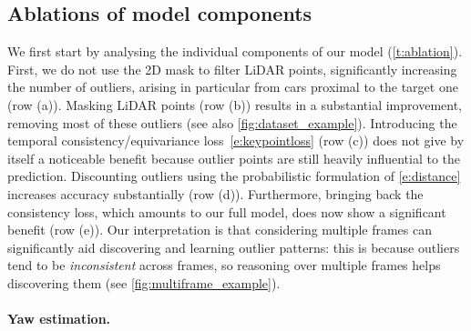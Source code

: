 


\subsection{Ablations of model components}

We first start by analysing the individual components of our model (\cref{t:ablation}).
First, we do not use the 2D mask to filter LiDAR points, significantly increasing the number of outliers, arising in particular from cars proximal to the target one (row (a)).
Masking LiDAR points (row (b)) results in a substantial improvement, removing most of these outliers (see also \cref{fig:dataset_example}).
Introducing the temporal consistency/equivariance loss~\eqref{e:keypointloss} (row (c)) does not give by itself a noticeable benefit because outlier points are still heavily influential to the prediction.
Discounting outliers using the probabilistic formulation of \cref{e:distance} increases accuracy substantially (row (d)).
Furthermore, bringing back the consistency loss, which amounts to our full model, does now show a significant benefit (row (e)).
Our interpretation is that considering multiple frames can significantly aid discovering and learning outlier patterns:
this is because outliers tend to be \emph{inconsistent} across frames, so reasoning over multiple frames helps discovering them (see \cref{fig:multiframe_example}).

\paragraph{Yaw estimation.}


